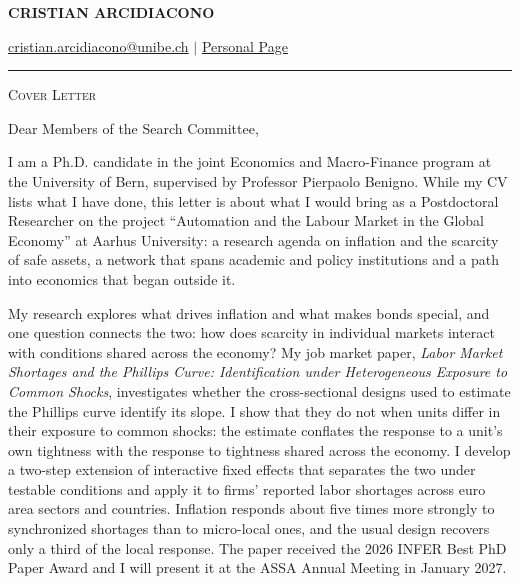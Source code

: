 \documentclass[11pt]{article}
\begin{document}
 
\begin{center}
    \textbf{\large \scshape CRISTIAN ARCIDIACONO}
\end{center}

\begin{center}
    {\href{mailto:cristian.arcidiacono@unibe.ch}{cristian.arcidiacono@unibe.ch} $\vert$ \href{https://sites.google.com/view/cristian-arcidiacono/home}{Personal Page}}
\end{center}
\vspace{-0.2cm}
\noindent\rule{\textwidth}{0.4pt}

\vspace{0.2cm}

\begin{center}
    {\large \scshape Cover Letter}
\end{center}

\vspace{0.3cm}

Dear Members of the Search Committee,

I am a Ph.D. candidate in the joint Economics and Macro-Finance program at the University of Bern, supervised by Professor Pierpaolo Benigno. While my CV lists what I have done, this letter is about what I would bring as a Postdoctoral Researcher on the project ``Automation and the Labour Market in the Global Economy'' at Aarhus University: a research agenda on inflation and the scarcity of safe assets, a network that spans academic and policy institutions and a path into economics that began outside it.

My research explores what drives inflation and what makes bonds special, and one question connects the two: how does scarcity in individual markets interact with conditions shared across the economy? My job market paper, \textit{Labor Market Shortages and the Phillips Curve: Identification under Heterogeneous Exposure to Common Shocks}, investigates whether the cross-sectional designs used to estimate the Phillips curve identify its slope. I show that they do not when units differ in their exposure to common shocks: the estimate conflates the response to a unit's own tightness with the response to tightness shared across the economy. I develop a two-step extension of interactive fixed effects that separates the two under testable conditions and apply it to firms' reported labor shortages across euro area sectors and countries. Inflation responds about five times more strongly to synchronized shortages than to micro-local ones, and the usual design recovers only a third of the local response. The paper received the 2026 INFER Best PhD Paper Award and I will present it at the ASSA Annual Meeting in January 2027.
\end{document}
